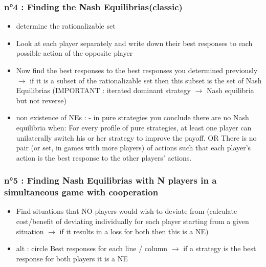 \documentclass{article}
\begin{document}
\subsubsection{n°4 : Finding the Nash Equilibrias(classic)}
\begin{itemize}
    \item determine the rationalizable set 
    \item Look at each player separately and write down their best responses to each possible action of the opposite player
    \item Now find the best responses to the best responses you determined previously $\rightarrow$ if it is a subset of the rationalizable set then this subset is the set of Nash Equilibrias (IMPORTANT : iterated dominant strategy $\rightarrow$ Nash equilibria but not reverse)
    \item non existence of NEs : 
        \subitem - in pure strategies you conclude there are no Nash equilibria when: For every profile of pure strategies, at least one player can unilaterally switch his or her strategy to improve the payoff. OR There is no pair (or set, in games with more players) of actions such that each player's action is the best response to the other players’ actions.
\end{itemize}

\subsubsection{n°5 : Finding Nash Equilibrias with N players in a simultaneous game with cooperation}
\begin{itemize}
    \item Find situations that NO players would wish to deviate from (calculate cost/benefit of deviating individually for each player starting from a given situation $\rightarrow$ if it results in a loss for both then this is a NE)
    \item alt : circle Best responses for each line / column $\rightarrow$ if a strategy is the best response for both players it is a NE 
\end{itemize}
\end{document}
